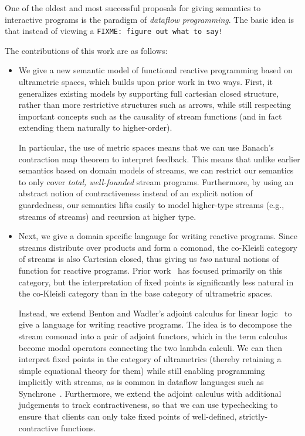 \documentclass[preprint]{sigplanconf}
\newcommand{\fixme}[1]{\texttt{FIXME: {#1}}}
\begin{document}
One of the oldest and most successful proposals for giving semantics
to interactive programs is the paradigm of \emph{dataflow programming}. 
The basic idea is that instead of viewing a \fixme{figure out what 
to say!}



The contributions of this work are as follows:

\begin{itemize}
\item We give a new semantic model of functional reactive programming
  based on ultrametric spaces, which builds upon prior work in two
  ways. First, it generalizes existing models by supporting full
  cartesian closed structure, rather than more restrictive structures
  such as arrows, while still respecting important concepts such as
  the causality of stream functions (and in fact extending them
  naturally to higher-order).

  In particular, the use of metric spaces means that we can use
  Banach's contraction map theorem to interpret feedback. This means
  that unlike earlier semantics based on domain models of streams, we
  can restrict our semantics to only cover \emph{total, well-founded}
  stream programs. Furthermore, by using an abstract notion of
  contractiveness instead of an explicit notion of guardedness, our
  semantics lifts easily to model higher-type streams (e.g., streams
  of streams) and recursion at higher type. 

\item Next, we give a domain specific langauge for writing reactive
  programs. Since streams distribute over products and form a comonad,
  the co-Kleisli category of streams is also Cartesian closed, thus
  giving us \emph{two} natural notions of function for reactive
  programs.  Prior work~\cite{coiterative, essence-dataflow} has
  focused primarily on this category, but the interpretation of fixed
  points is significantly less natural in the co-Kleisli category than
  in the base category of ultrametric spaces.

  Instead, we extend Benton and Wadler's adjoint calculus for linear
  logic~\cite{benton-wadler} to give a language for writing reactive
  programs. The idea is to decompose the stream comonad into a pair of
  adjoint functors, which in the term calculus become modal operators
  connecting the two lambda calculi. We can then interpret fixed
  points in the category of ultrametrics (thereby retaining a simple
  equational theory for them) while still enabling programming
  implicitly with streams, as is common in dataflow languages such as
  Synchrone~\cite{synchrone}. Furthermore, we extend the adjoint
  calculus with additional judgements to track contractiveness, so
  that we can use typechecking to ensure that clients can only take
  fixed points of well-defined, strictly-contractive functions.


\end{itemize}
\end{document}
